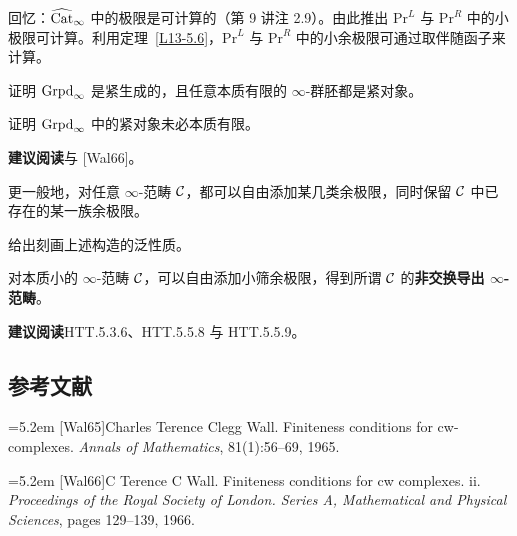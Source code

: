 \begin{remark}\label{L13-5.9}
回忆：$\widehat{\operatorname{Cat}}_\infty$ 中的极限是可计算的（第 9 讲注 2.9）。由此推出 $\mathrm{Pr}^{L}$ 与 $\mathrm{Pr}^{R}$ 中的小极限可计算。利用定理~\ref{L13-5.6}，$\mathrm{Pr}^{L}$ 与 $\mathrm{Pr}^{R}$ 中的小余极限可通过取伴随函子来计算。
\end{remark}


\begin{exercise}\label{L13-A.1}
证明 $\operatorname{Grpd}_\infty$ 是紧生成的，且任意本质有限的 $\infty$-群胚都是紧对象。
\end{exercise}

\begin{exercise}\label{L13-A.2}
证明 $\operatorname{Grpd}_\infty$ 中的紧对象未必本质有限。
\end{exercise}

\nitem\label{L13-A.3} \textbf{建议阅读}\quad [Wal65] 与 [Wal66]。


\nitem\label{L13-B.1} 更一般地，对任意 $\infty$-范畴 $\mathcal{C}$，都可以自由添加某几类余极限，同时保留 $\mathcal{C}$ 中已存在的某一族余极限。

\begin{exercise}\label{L13-B.2}
给出刻画上述构造的泛性质。
\end{exercise}

\begin{example}\label{L13-B.3}
对本质小的 $\infty$-范畴 $\mathcal{C}$，可以自由添加小筛余极限，得到所谓 $\mathcal{C}$ 的\textbf{非交换导出 $\infty$-范畴}。
\end{example}

\nitem\label{L13-B.4} \textbf{建议阅读}\quad HTT.5.3.6、HTT.5.5.8 与 HTT.5.5.9。

\subsection*{参考文献}
\par\noindent\hangindent=5.2em [Wal65]\hspace{0.6em}Charles Terence Clegg Wall. Finiteness conditions for cw-complexes. \emph{Annals of Mathematics}, 81(1):56--69, 1965.
\par\noindent\hangindent=5.2em [Wal66]\hspace{0.6em}C Terence C Wall. Finiteness conditions for cw complexes. ii. \emph{Proceedings of the Royal Society of London. Series A, Mathematical and Physical Sciences}, pages 129--139, 1966.
